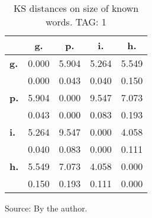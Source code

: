 \begin{table}[h!]
\begin{center}
\caption{KS distances on size of known words. TAG: 1}
\begin{tabular}{| l || c | c | c | c |}\hline
 & {\bf g.} & {\bf p.} & {\bf i.} & {\bf h.} \\\hline\hline
{\bf g.} & 0.000 & 5.904 & 5.264 & 5.549 \\
{\bf } & 0.000 & 0.043 & 0.040 & 0.150 \\\hline
{\bf p.} & 5.904 & 0.000 & 9.547 & 7.073 \\
{\bf } & 0.043 & 0.000 & 0.083 & 0.193 \\\hline
{\bf i.} & 5.264 & 9.547 & 0.000 & 4.058 \\
{\bf } & 0.040 & 0.083 & 0.000 & 0.111 \\\hline
{\bf h.} & 5.549 & 7.073 & 4.058 & 0.000 \\
{\bf } & 0.150 & 0.193 & 0.111 & 0.000 \\\hline
\end{tabular}
\begin{flushleft}\footnotesize
		Source: By the author.\
\end{flushleft}
\end{center}
\end{table} 
